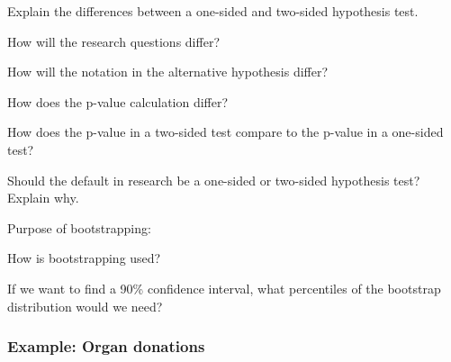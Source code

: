 \documentclass[
]{report}
\newcommand{\rgs}{\vspace{12pt}} %
\newcommand{\rgi}{\hspace{24pt}}  %
\begin{document}
Explain the differences between a one-sided and two-sided hypothesis test.
\vspace{1mm}

\rgi How will the research questions differ?
\rgs

\rgi How will the notation in the alternative hypothesis differ?
\rgs

\rgi How does the p-value calculation differ?
\rgs

How does the p-value in a two-sided test compare to the p-value in a one-sided test?
\rgs

Should the default in research be a one-sided or two-sided hypothesis test? Explain why.
\rgs
\rgs

Purpose of bootstrapping:
\rgs

How is bootstrapping used?\\
\rgs

If we want to find a 90\% confidence interval, what percentiles of the bootstrap distribution would we need?\\
\rgs

\hypertarget{example-organ-donations}{%
\subsubsection*{Example: Organ donations}\label{example-organ-donations}}
\end{document}
